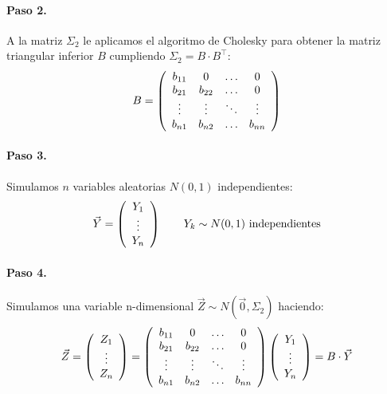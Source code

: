 \paragraph{Paso 2.} A la matriz $\Sigma_2$ le aplicamos el algoritmo de 
Cholesky para obtener la matriz triangular
inferior $B$ cumpliendo $\Sigma_2 = B \cdot B^{\top}$:
\begin{displaymath}
B = 
\left(
\begin{array}{cccc}
b_{11}   & 0        & \ldots & 0       \cr
b_{21}   & b_{22}   & \ldots & 0       \cr
\vdots  & \vdots  & \ddots & \vdots \cr
b_{n1}   & b_{n2}   & \ldots & b_{nn}
\end{array}
\right)
\end{displaymath}

\paragraph{Paso 3.} Simulamos $n$ variables aleatorias $N(0,1)$ independientes:
\begin{displaymath}
\vec{Y} =
\left(
\begin{array}{c}
Y_1 \cr
\vdots \cr
Y_n
\end{array}
\right) 
\qquad Y_k \sim N(0,1) \textrm{ independientes}
\end{displaymath}

\paragraph{Paso 4.} Simulamos una variable n-dimensional $\vec{Z} \sim N(\vec{0}, \Sigma_2)$
haciendo:
\begin{displaymath}
\vec{Z} = 
\left(
\begin{array}{c}
Z_1 \cr
\vdots \cr
Z_n
\end{array}
\right) 
=
\left(
\begin{array}{cccc}
b_{11}   & 0        & \ldots & 0       \cr
b_{21}   & b_{22}   & \ldots & 0       \cr
\vdots  & \vdots  & \ddots & \vdots \cr
b_{n1}   & b_{n2}   & \ldots & b_{nn}
\end{array}
\right)
\left(
\begin{array}{c}
Y_1 \cr
\vdots \cr
Y_n
\end{array}
\right) 
 = B \cdot \vec{Y}
\end{displaymath}

